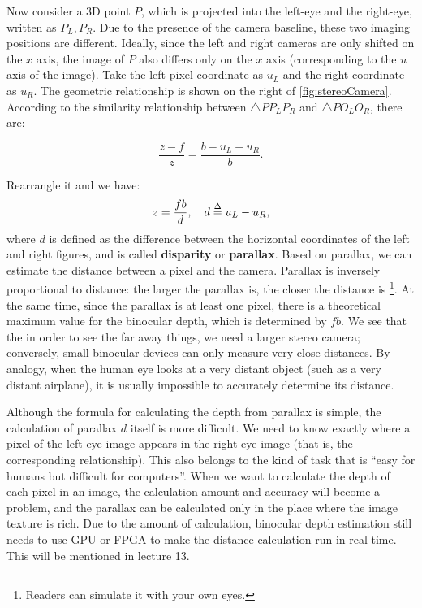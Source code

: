 Now consider a 3D point $P$, which is projected into the left-eye and the right-eye, written as $P_L, P_R$. Due to the presence of the camera baseline, these two imaging positions are different. Ideally, since the left and right cameras are only shifted on the $x$ axis, the image of $P$ also differs only on the $x$ axis (corresponding to the $u$ axis of the image). Take the left pixel coordinate as $u_L$ and the right coordinate as $u_R$. The geometric relationship is shown on the right of \autoref{fig:stereoCamera}. According to the similarity relationship between $ \triangle P P_L P_R$ and $\triangle P O_L O_R$, there are:

\begin{equation}
\frac{{z - f}}{z} = \frac{{b - {u_L} + {u_R}}}{b}.
\end{equation}

Rearrangle it and we have:
\begin{equation}
z = \frac{{fb}}{d}, \quad d \buildrel \Delta \over = {u_L} - {u_R},
\end{equation}
where $d$ is defined as the difference between the horizontal coordinates of the left and right figures, and is called \textbf{disparity} or \textbf{parallax}. Based on parallax, we can estimate the distance between a pixel and the camera. Parallax is inversely proportional to distance: the larger the parallax is, the closer the distance is \footnote {Readers can simulate it with your own eyes.}. At the same time, since the parallax is at least one pixel, there is a theoretical maximum value for the binocular depth, which is determined by $fb$. We see that the in order to see the far away things, we need a larger stereo camera; conversely, small binocular devices can only measure very close distances. By analogy, when the human eye looks at a very distant object (such as a very distant airplane), it is usually impossible to accurately determine its distance.

Although the formula for calculating the depth from parallax is simple, the calculation of parallax $d$ itself is more difficult. We need to know exactly where a pixel of the left-eye image appears in the right-eye image (that is, the corresponding relationship). This also belongs to the kind of task that is ``easy for humans but difficult for computers''. When we want to calculate the depth of each pixel in an image, the calculation amount and accuracy will become a problem, and the parallax can be calculated only in the place where the image texture is rich. Due to the amount of calculation, binocular depth estimation still needs to use GPU or FPGA to make the distance calculation run in real time. This will be mentioned in lecture 13.

